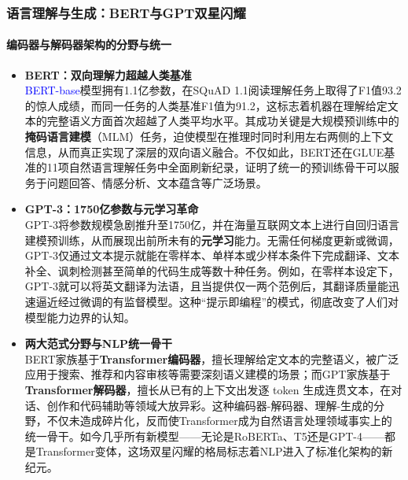 \documentclass[11pt]{beamer}
\begin{document}
\begin{frame}
\frametitle{语言理解与生成：BERT与GPT双星闪耀}
\framesubtitle{编码器与解码器架构的分野与统一}

\begin{itemize}
    \item \textbf{BERT：双向理解力超越人类基准} \\
    \textcolor{blue}{BERT-base}模型拥有1.1亿参数，在SQuAD 1.1阅读理解任务上取得了\alert{F1值93.2}的惊人成绩，而同一任务的人类基准F1值为91.2，这标志着机器在理解给定文本的完整语义方面首次超越了人类平均水平。其成功关键是大规模预训练中的\textbf{掩码语言建模}（MLM）任务，迫使模型在推理时同时利用左右两侧的上下文信息，从而真正实现了深层的双向语义融合。不仅如此，BERT还在GLUE基准的11项自然语言理解任务中全面刷新纪录，证明了统一的预训练骨干可以服务于问题回答、情感分析、文本蕴含等广泛场景。

    \item \textbf{GPT-3：1750亿参数与元学习革命} \\
    GPT-3将参数规模急剧推升至\alert{1750亿}，并在海量互联网文本上进行自回归语言建模预训练，从而展现出前所未有的\textbf{元学习}能力。无需任何梯度更新或微调，GPT-3仅通过文本提示就能在零样本、单样本或少样本条件下完成翻译、文本补全、讽刺检测甚至简单的代码生成等数十种任务。例如，在零样本设定下，GPT-3就可以将英文翻译为法语，且当提供仅一两个范例后，其翻译质量能迅速逼近经过微调的有监督模型。这种“提示即编程”的模式，彻底改变了人们对模型能力边界的认知。

    \item \textbf{两大范式分野与NLP统一骨干} \\
    BERT家族基于\textbf{Transformer编码器}，擅长理解给定文本的完整语义，被广泛应用于搜索、推荐和内容审核等需要深刻语义建模的场景；而GPT家族基于\textbf{Transformer解码器}，擅长从已有的上下文出发逐 token 生成连贯文本，在对话、创作和代码辅助等领域大放异彩。这种编码器-解码器、理解-生成的分野，不仅未造成碎片化，反而使Transformer成为自然语言处理领域\alert{事实上的统一骨干}。如今几乎所有新模型——无论是RoBERTa、T5还是GPT-4——都是Transformer变体，这场双星闪耀的格局标志着NLP进入了标准化架构的新纪元。
\end{itemize}
\end{frame}
\end{document}
